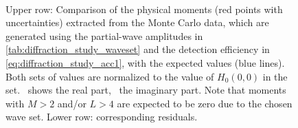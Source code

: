 \begin{figure}[tbp]
  \centering%
  \\%
  \caption{Upper row: Comparison of the physical moments (red points
  with uncertainties) extracted from the Monte Carlo data, which are
  generated using the partial-wave amplitudes in
  \cref{tab:diffraction_study_waveset} and the detection efficiency in
  \cref{eq:diffraction_study_acc1}, with the expected values (blue
  lines).  Both sets of values are normalized to the value of $H_0(0,
  0)$ in the set.
  ~shows the real
  part, ~the
  imaginary part.  Note that moments with $M > 2$ and/or $L > 4$ are
  expected to be zero due to the chosen wave set.  Lower row:
  corresponding residuals.}%
  \label{fig:diffraction_study_output}%
\end{figure}

